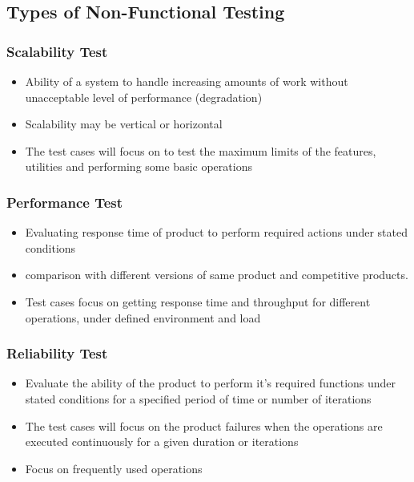 \documentclass{article}
\begin{document}
\subsection{Types of Non-Functional Testing}
\subsubsection{Scalability Test}
\begin{itemize}
    \item Ability of a system to handle increasing amounts of  work without unacceptable level of performance  (degradation)

    \item Scalability may be vertical or horizontal
    
    \item The test cases will focus on to test the  maximum limits of the features, utilities and  performing some basic operations
\end{itemize}

\subsubsection{Performance Test}
\begin{itemize}
    \item Evaluating response time of product to perform required actions under  stated conditions 
    
    \item comparison with different versions of same product and competitive products.
    
    \item Test cases focus on getting response time  and throughput  for  different  operations,  under  defined environment and load
\end{itemize}

\subsubsection{Reliability Test}
\begin{itemize}
    \item Evaluate the ability of the product to  perform it's required functions under stated conditions for a  specified period of time or number of iterations
    
    \item The test cases will focus on the product failures  when the operations are executed continuously  for a given duration or iterations
    
    \item Focus on frequently used operations
\end{itemize}
\end{document}
